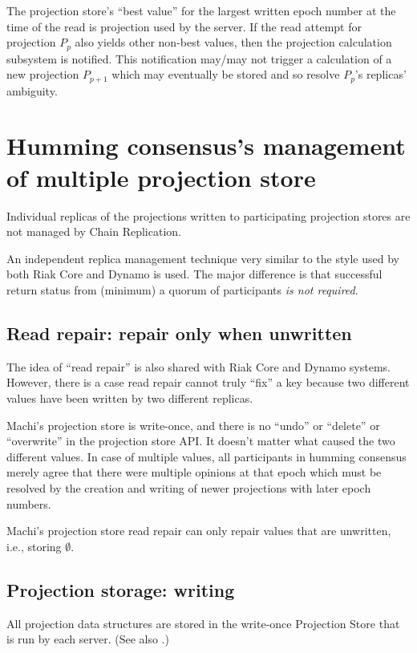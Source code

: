 \documentclass[preprint,10pt]{sigplanconf}
\begin{document}
The projection store's ``best value'' for the largest written epoch
number at the time of the read is projection used by the server.
If the read attempt for projection $P_p$
also yields other non-best values, then the
projection calculation subsystem is notified.  This notification
may/may not trigger a calculation of a new projection $P_{p+1}$ which
may eventually be stored and so
resolve $P_p$'s replicas' ambiguity.

\section{Humming consensus's management of multiple projection store}

Individual replicas of the projections written to participating
projection stores are not managed by Chain Replication.

An independent replica management technique very similar to the style
used by both Riak Core \cite{riak-core} and Dynamo is used.
The major difference is
that successful return status from (minimum) a quorum of participants
{\em is not required}.

\subsection{Read repair: repair only when unwritten}

The idea of ``read repair'' is also shared with Riak Core and Dynamo
systems.  However, there is a case read repair cannot truly ``fix'' a
key because two different values have been written by two different
replicas.

Machi's projection store is write-once, and there is no ``undo'' or
``delete'' or ``overwrite'' in the projection store API.  It doesn't
matter what caused the two different values.  In case of multiple
values, all participants in humming consensus merely agree that there
were multiple opinions at that epoch which must be resolved by the
creation and writing of newer projections with later epoch numbers.

Machi's projection store read repair can only repair values that are
unwritten, i.e., storing $\emptyset$.

\subsection{Projection storage: writing}
\label{sub:proj-store-writing}

All projection data structures are stored in the write-once Projection
Store that is run by each server.  (See also \cite{machi-design}.)
\end{document}
